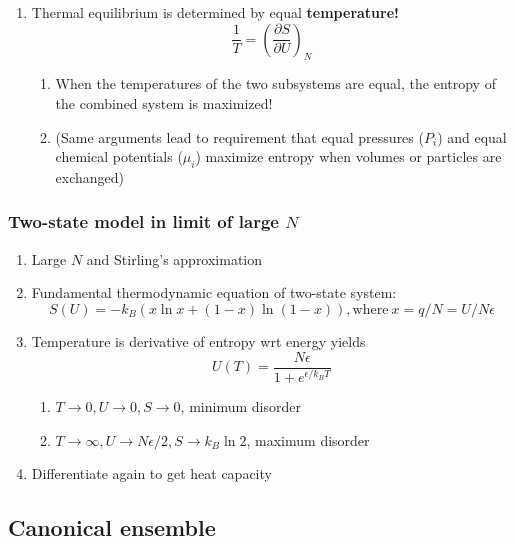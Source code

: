 \documentclass[11pt]{article}
\begin{document}
\begin{enumerate}
\item Thermal equilibrium is determined by equal \textbf{temperature!}
\begin{displaymath}
    \frac{1}{T}=\left ( \frac{\partial S}{\partial U} \right )_N
  \end{displaymath}
\begin{enumerate}
\item When the temperatures of the two subsystems are equal, the
entropy of the combined system is maximized!
\item (Same arguments lead to requirement that equal pressures (\(P_i\)) and
equal chemical potentials (\(\mu_i\)) maximize entropy when volumes or
particles are exchanged)
\end{enumerate}
\end{enumerate}

\subsubsection{Two-state model in limit of large \(N\)}
\label{sec:org8b46902}
\begin{enumerate}
\item Large \(N\) and Stirling's approximation
\item Fundamental thermodynamic equation of two-state system:
\begin{displaymath}
  S(U)=-k_B \left ( x \ln x + (1-x) \ln (1-x) \right ), \mathrm{where}\
  x = q/N = U/N\epsilon
\end{displaymath}
\item Temperature is derivative of entropy wrt energy yields
\begin{displaymath}
  U(T) = \frac{N\epsilon}{1+e^{\epsilon/k_BT}}
\end{displaymath}
\begin{enumerate}
\item \(T \rightarrow 0, U \rightarrow 0, S \rightarrow 0\), minimum disorder
\item \(T \rightarrow \infty, U \rightarrow N\epsilon/2, S \rightarrow
              k_B \ln 2\), maximum disorder
\end{enumerate}
\item Differentiate again to get heat capacity
\end{enumerate}

\subsection{Canonical ensemble}
\label{sec:orgbafe4ba}
\end{document}

